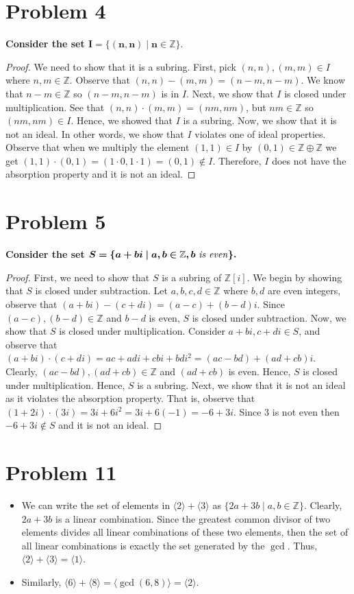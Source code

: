 \documentclass[a4paper,12pt]{article}
\begin{document}
\section*{Problem 4}
\textbf{Consider the set $\bm{I = \{(n,n) \mid n \in \mathbb{Z}\}.}$}
\begin{proof}
 We need to show that it is a subring. First, pick $(n,n), (m,m) \in I$ where $n,m \in \mathbb{Z}.$ Observe that $(n,n)-(m,m)=(n-m,n-m)$. We know that $n-m \in \mathbb{Z}$ so $(n-m,n-m)$ is in $I.$ Next, we show that $I$ is closed under multiplication. See that $(n,n) \cdot (m,m)=(nm,nm)$, but $nm \in \mathbb{Z}$ so $(nm,nm) \in I.$ Hence, we showed that $I$ is a subring.
Now, we show that it is not an ideal. In other words, we show that $I$ violates one of ideal properties. Observe that when we multiply the element $(1,1) \in I$ by $(0,1) \in \mathbb{Z}\oplus\mathbb{Z}$ we get $(1,1)\cdot (0,1)=(1 \cdot 0, 1 \cdot 1)=(0,1) \notin I.$ Therefore, $I$ does not have the absorption property and it is not an ideal.   
\end{proof}
\section*{Problem 5}
\textbf{Consider the set $\bm{S = \{a+bi \mid a,b \in \mathbb{Z}, b \text{ \textit{is even}}\}.}$}
\begin{proof}
    First, we need to show that $S$ is a subring of $\mathbb{Z}[i].$ We begin by showing that $S$ is closed under subtraction. Let $a,b,c,d \in \mathbb{Z}$ where $b,d$ are even integers, observe that $(a+bi)-(c+di)=(a-c)+(b-d)i.$ Since $(a-c), (b-d) \in \mathbb{Z}$ and $b-d$ is even, $S$ is closed under subtraction. Now, we show that $S$ is closed under multiplication. Consider $a+bi,c+di \in S$, and observe that $(a+bi) \cdot (c+di)=ac+adi+cbi+bdi^{2}=(ac-bd)+(ad+cb)i$. Clearly, $(ac-bd), (ad+cb) \in \mathbb{Z}$ and $(ad+cb)$ is even. Hence, $S$ is closed under multiplication. Hence, $S$ is a subring.
    Next, we show that it is not an ideal as it violates the absorption property. That is, observe that $(1+2i) \cdot (3i)=3i+6i^2=3i+6(-1)=-6+3i$. Since $3$ is not even then $-6+3i \notin S$ and it is not an ideal.
\end{proof}
\section*{Problem 11}
\begin{itemize}
    \item [a)] We can write the set of elements in $\langle 2 \rangle + \langle 3 \rangle$ as $\{2a+3b \mid a,b \in \mathbb{Z}\}.$ Clearly, $2a+3b$ is a linear combination. Since the greatest common divisor of two elements divides all linear combinations of these two elements, then the set of all linear combinations is exactly the set generated by the $\operatorname{gcd}.$ Thus, $\langle 2 \rangle + \langle 3 \rangle = \langle 1 \rangle.$
    \item [b)] Similarly, $\langle 6 \rangle + \langle 8 \rangle = \langle \operatorname{gcd}(6,8) \rangle = \langle 2 \rangle.$
\end{itemize}
 \label{sec:prob15}
\end{document}
